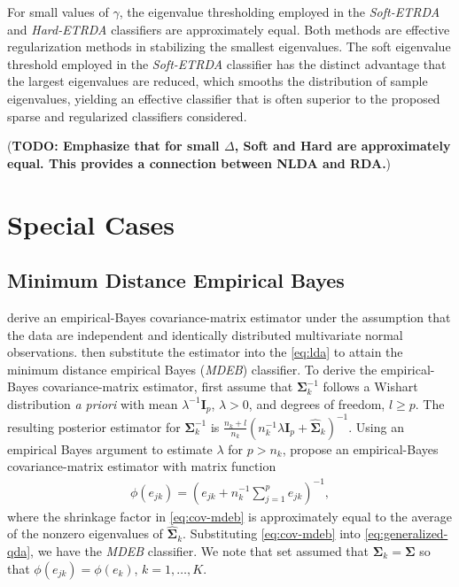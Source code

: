 \documentclass[11pt]{article}
\begin{document}
For small values of $\gamma$, the eigenvalue thresholding employed in the \emph{Soft-ETRDA} and \emph{Hard-ETRDA} classifiers are approximately equal. Both methods are effective regularization methods in stabilizing the smallest eigenvalues. The soft eigenvalue threshold employed in the \emph{Soft-ETRDA} classifier has the distinct advantage that the largest eigenvalues are reduced, which smooths the distribution of sample eigenvalues, yielding an effective classifier that is often superior to the proposed sparse and regularized classifiers considered.

(\textbf{TODO: Emphasize that for small $\Delta$, Soft and Hard are approximately equal. This provides a connection between NLDA and RDA.})

\section{Special Cases}

\subsection{Minimum Distance Empirical Bayes}

\cite{Srivastava:2007ww} derive an empirical-Bayes covariance-matrix estimator under the assumption that the data are independent and identically distributed multivariate normal observations. \cite{Srivastava:2007ww} then substitute the estimator into the \eqref{eq:lda} to attain the minimum distance empirical Bayes (\emph{MDEB}) classifier. To derive the empirical-Bayes covariance-matrix estimator, \cite{Srivastava:2007ww} first assume that $\bm \Sigma_k^{-1}$ follows a Wishart distribution \emph{a priori} with mean $\lambda^{-1} \bm I_p$, $\lambda > 0$, and degrees of freedom, $l \ge p$. The resulting posterior estimator for $\bm \Sigma_k^{-1}$ is $\frac{n_k + l}{n_k}(n_k^{-1}\lambda \bm I_p + \widehat{\bm \Sigma}_k)^{-1}$. Using an empirical Bayes argument to estimate $\lambda$ for $p > n_k$, \cite{Srivastava:2007ww} propose an empirical-Bayes covariance-matrix estimator with matrix function
\begin{align}
	\phi(e_{jk}) = \left(e_{jk} + n_k^{-1} \sum_{j = 1}^p e_{jk}\right)^{-1},\label{eq:cov-mdeb}
\end{align}
where the shrinkage factor in \eqref{eq:cov-mdeb} is approximately equal to the average of the nonzero eigenvalues of $\widehat{\bm \Sigma}_k$. Substituting \eqref{eq:cov-mdeb} into \eqref{eq:generalized-qda}, we have the \emph{MDEB} classifier. We note that \cite{Srivastava:2007ww} set assumed that $\bm \Sigma_k = \bm \Sigma$ so that $\phi(e_{jk}) = \phi(e_k)$, $k = 1, \ldots, K$.
\end{document}
